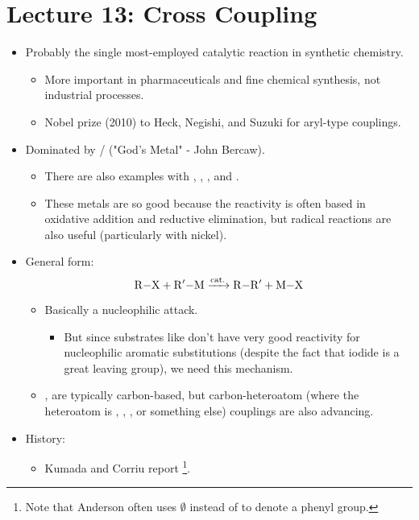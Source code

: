 \documentclass[../notes.tex]{subfiles}
\begin{document}
\section{Lecture 13: Cross Coupling}
\begin{itemize}
    \item {}Probably the single most-employed catalytic reaction in synthetic chemistry.
    \begin{itemize}
        \item More important in pharmaceuticals and fine chemical synthesis, not industrial processes.
        \item Nobel prize (2010) to Heck, Negishi, and Suzuki for aryl-type couplings.
    \end{itemize}
    \item Dominated by  /  ("God's Metal" - John Bercaw).
    \begin{itemize}
        \item There are also examples with , , , and .
        \item These metals are so good because the reactivity is often based in oxidative addition and reductive elimination, but radical reactions are also useful (particularly with nickel).
    \end{itemize}
    \item General form:
    \begin{equation*}
        \ce{R-X + R$'$-M ->[{cat.}] R-R$'$ + M-X}
    \end{equation*}
    \begin{itemize}
        \item Basically a nucleophilic attack.
        \begin{itemize}
            \item But since substrates like  don't have very good reactivity for nucleophilic aromatic substitutions (despite the fact that iodide is a great leaving group), we need this mechanism.
        \end{itemize}
        \item {},  are typically carbon-based, but carbon-heteroatom (where the heteroatom is , , , or something else) couplings are also advancing.
    \end{itemize}
    \item History:
    \begin{itemize}
        \item Kumada and Corriu report \footnote{Note that Anderson often uses $\emptyset$ instead of  to denote a phenyl group.}.

\end{itemize}
\end{itemize}
\end{document}
